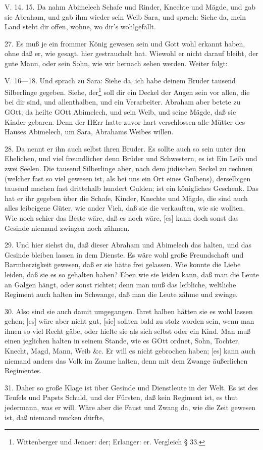 \begin{schriftzitat}
V. 14. 15. Da nahm Abimelech Schafe und Rinder, Knechte und Mägde, und gab sie Abraham, und gab ihm wieder sein Weib Sara, und sprach: Siehe da, mein Land steht dir offen, wohne, wo dir’s wohlgefällt.
\end{schriftzitat}

27. Es muß je ein frommer König gewesen sein und Gott wohl erkannt haben, ohne daß er, wie gesagt, hier gestrauchelt hat. Wiewohl er nicht darauf bleibt, der gute Mann, oder sein Sohn, wie wir hernach sehen werden. Weiter folgt:

\begin{schriftzitat}
V. 16—18. Und sprach zu Sara: Siehe da, ich habe deinem Bruder tausend Silberlinge gegeben. Siehe, der\footnote{Wittenberger und Jenaer: der; Erlanger: er. Vergleich § 33.} soll dir ein Deckel der Augen sein vor allen, die bei dir sind, und allenthalben, und ein Verarbeiter. Abraham aber betete zu GOtt; da heilte GOtt Abimelech, und sein Weib, und seine Mägde, daß sie Kinder gebaren. Denn der HErr hatte zuvor hart verschlossen alle Mütter des Hauses Abimelech, um Sara, Abrahams Weibes willen.
\end{schriftzitat}


28. Da nennt er ihn auch selbst ihren Bruder. Es sollte auch so sein unter den Ehelichen, und viel freundlicher denn Brüder und Schwestern, es ist Ein Leib und zwei Seelen. Die tausend Silberlinge aber, nach dem jüdischen Seckel zu rechnen (welcher fast so viel gewesen ist, als bei uns ein Ort eines Gulbens), derselbigen tausend machen fast drittehalb hundert Gulden; ist ein königliches Geschenk. Das hat er ihr gegeben über die Schafe, Kinder, Knechte und Mägde, die sind auch alles leibeigene Güter, wie ander Vieh, daß sie die verkauften, wie sie wollten. Wie noch schier das Beste wäre, daß es noch wäre, [es] kann doch sonst das Gesinde niemand zwingen noch zähmen.

29. Und hier siehst du, daß dieser Abraham und Abimelech das halten, und das Gesinde bleiben lassen in dem Dienste. Es wäre wohl große Freundschaft und Barmherzigkeit gewesen, daß er sie hätte frei gelassen. Wie konnte die Liebe leiden, daß sie es so gehalten haben? Eben wie sie leiden kann, daß man die Leute an Galgen hängt, oder sonst richtet; denn man muß das leibliche, weltliche Regiment auch halten im Schwange, daß man die Leute zähme und zwinge.

30. Also sind sie auch damit umgegangen. Ihret halben hätten sie es wohl lassen gehen; [es] wäre aber nicht gut, [sie] sollten bald zu stolz worden sein, wenn man ihnen so viel Recht gäbe, oder hielte sie als sich selbst oder ein Kind. Man muß einen jeglichen halten in seinem Stande, wie es GOtt ordnet, Sohn, Tochter, Knecht, Magd, Mann, Weib \&c. Er will es nicht gebrochen haben; [es] kann auch niemand anders das Volk im Zaume halten, denn mit dem Zwange äußerlichen Regimentes.

31. Daher so große Klage ist über Gesinde und Dienstleute in der Welt. Es ist des Teufels und Papsts Schuld, und der Fürsten, daß kein Regiment ist, es thut jedermann, was er will. Wäre aber die Faust und Zwang da, wie die Zeit gewesen ist, daß niemand mucken dürfte,
